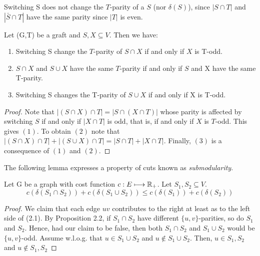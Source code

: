 \begin{observation}
Switching S does not change the $T$-parity of a $S$ (nor  $\delta(S)$), since $|S \cap T|$ and $|\bar{S} \cap T|$ have the same parity since $|T|$ is even.
\end{observation}

\begin{proposition}
Let (G,T) be a graft and $S, X \subseteq V$. Then we have: 
\begin{enumerate}
\item Switching S change the $T$-parity of $S \cap X$ if and only if $X$ is T-odd.\\
\item $S \cap X$ and $S \cup X$ have the same $T$-parity if and only if $S$ and X have the same T-parity. \\
\item Switching S changes the T-parity of $S \cup X$ if and only if X is T-odd.
\end{enumerate}
\end{proposition}

\begin{proof}
Note that $|(S \cap X) \cap T| = |S \cap (X \cap T)|$ whose parity is affected by switching $S$ if and only if $|X \cap T|$ is odd, that is, if and only if $X$ is $T$-odd. This gives $(1)$. To obtain $(2)$ note that $|(S \cap X) \cap T| + |(S \cup X) \cap T| = |S \cap T| + |X \cap T|$. Finally, $(3)$ is a consequence of $(1)$ and $(2)$.
\end{proof}

The following lemma expresses a property of cuts known as \emph{submodularity}.
\begin{lemma}
Let G be a graph with cost function $c: E \longmapsto \mathbb{R}_+$. Let $S_{1}, S_{2} \subseteq V$.
\begin{equation}
c(\delta(S_{1} \cap S_{2})) + c(\delta(S_{1} \cup S_{2})) \leq c(\delta(S_1)) + c(\delta(S_2))
\end{equation}
\end{lemma}

\begin{proof}
We claim that each edge $uv$ contributes to the right at least as to the left side of (2.1). By Proposition 2.2, if $S_1 \cap S_2$ have different $\{u,v\}$-parities, so do $S_1$ and $S_2$. Hence, had our claim to be false, then both $S_1 \cap S_2$ and $S_1 \cup S_2$ would be $\{u,v\}$-odd. Assume w.l.o.g. that $u \in S_1 \cup S_2$ and $u \notin S_1 \cup S_2$. Then, $u \in S_1, S_2$ and $u \notin S_1, S_2$
\end{proof}

